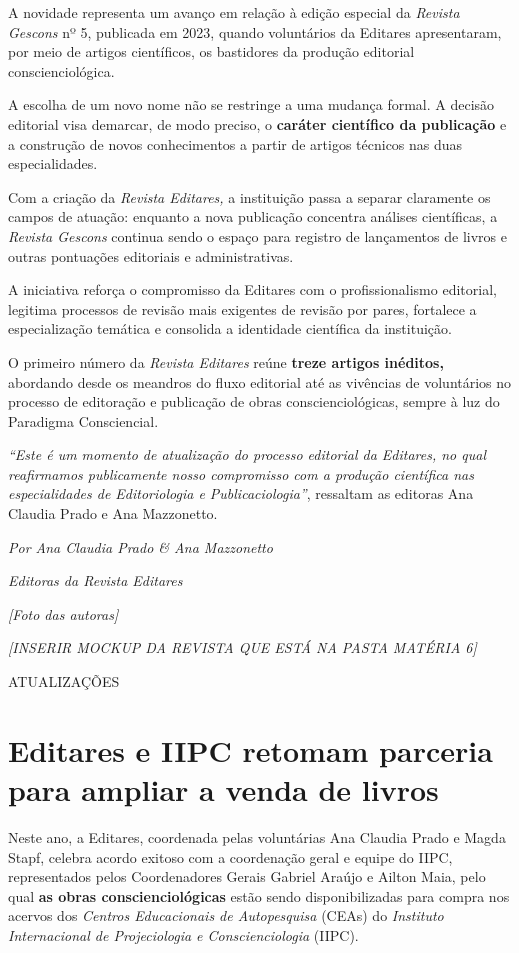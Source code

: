 \documentclass[
]{article}
\begin{document}
A novidade representa um avanço em relação à edição especial da \emph{Revista Gescons} nº 5, publicada em 2023, quando voluntários da Editares apresentaram, por meio de artigos científicos, os bastidores da produção editorial conscienciológica.

A escolha de um novo nome não se restringe a uma mudança formal. A decisão editorial visa demarcar, de modo preciso, o \textbf{caráter científico da publicação} e a construção de novos conhecimentos a partir de artigos técnicos nas duas especialidades.

Com a criação da \emph{Revista Editares,} a instituição passa a separar claramente os campos de atuação: enquanto a nova publicação concentra análises científicas, a \emph{Revista Gescons} continua sendo o espaço para registro de lançamentos de livros e outras pontuações editoriais e administrativas.

A iniciativa reforça o compromisso da Editares com o profissionalismo editorial, legitima processos de revisão mais exigentes de revisão por pares, fortalece a especialização temática e consolida a identidade científica da instituição.

O primeiro número da \emph{Revista Editares} reúne \textbf{treze artigos inéditos,} abordando desde os meandros do fluxo editorial até as vivências de voluntários no processo de editoração e publicação de obras conscienciológicas, sempre à luz do Paradigma Consciencial.

\emph{``Este é um momento de atualização do processo editorial da Editares, no qual reafirmamos publicamente nosso compromisso com a produção científica nas especialidades de Editoriologia e Publicaciologia''}, ressaltam as editoras Ana Claudia Prado e Ana Mazzonetto.

\emph{Por Ana Claudia Prado \& Ana Mazzonetto}

\emph{Editoras da Revista Editares}

\emph{{[}Foto das autoras{]}}

\emph{{[}INSERIR MOCKUP DA REVISTA QUE ESTÁ NA PASTA MATÉRIA 6{]}}

ATUALIZAÇÕES

\section{Editares e IIPC retomam parceria para ampliar a venda de livros}\label{editares-e-iipc-retomam-parceria-para-ampliar-a-venda-de-livros}

Neste ano, a Editares, coordenada pelas voluntárias Ana Claudia Prado e Magda Stapf, celebra acordo exitoso com a coordenação geral e equipe do IIPC, representados pelos Coordenadores Gerais Gabriel Araújo e Ailton Maia, pelo qual \textbf{as obras conscienciológicas} estão sendo disponibilizadas para compra nos acervos dos \emph{Centros Educacionais de Autopesquisa} (CEAs) do \emph{Instituto Internacional de Projeciologia e Cons­cienciologia} (IIPC).
\end{document}
